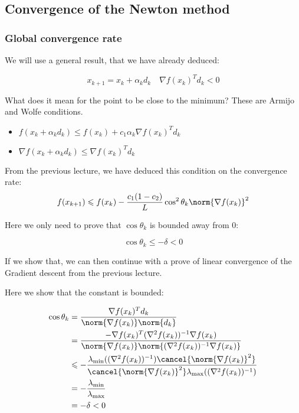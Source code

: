 \subsection{Convergence of the Newton method}

\subsubsection{Global convergence rate}

We will use a general result, that we have already deduced: 

\[
    x_{k+1} = x_k + \alpha_k d_k \quad \nabla f(x_{k})^T d_k < 0 
\]

What does it mean for the point to be close to the minimum? These are Armijo and Wolfe conditions.
\begin{itemize}
    \item $f(x_k + \alpha_k d_k) \leqslant f(x_k) + c_1 \alpha_k \nabla f(x_k)^T d_k$
    \item $\nabla f(x_k + \alpha_k d_k) \leqslant \nabla f(x_k)^T d_k$
\end{itemize}

From the previous lecture, we have deduced this condition on the convergence rate:  
\[ 
    f(x_{k+1}) \leqslant f(x_k) - \frac{c_1 (1 - c_2)}{L} \cos^2 \theta_k \norm{\nabla f(x_k)}^2
\] 

Here we only need to prove that $\cos \theta_k$ is bounded away from 0: 

\[ 
    \cos \theta_k \leqslant -\delta < 0
\]

If we show that, we can then continue with a prove of linear convergence of the Gradient descent from the previous lecture.

Here we show that the constant is bounded: 

\begin{align*}
    \cos \theta_k &= \frac{\nabla f(x_k)^T d_k}{\norm{\nabla f(x_k)} \norm{d_k}} \\ 
    &= \frac{- \nabla f(x_k)^T (\nabla^2 f(x_k))^{-1} \nabla f(x_k)}{\norm{\nabla f(x_k)} \norm{(\nabla^2 f(x_k))^{-1} \nabla f(x_k)}} \\ 
    &\leqslant - \frac{\lambda_{\min}((\nabla^2 f(x_k))^{-1}) \cancel{\norm{\nabla f(x_k)}^2}}{\cancel{\norm{\nabla f(x_k)}^2} \lambda_{\max}((\nabla^2 f(x_k))^{-1})} \\ 
    &= - \frac{\lambda_{\min}}{\lambda_{\max}} \\ 
    &= -\delta < 0 
\end{align*}


